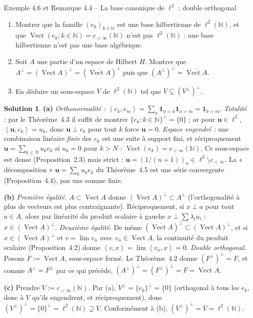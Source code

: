 \documentclass[11pt,a4paper]{article}
\newcommand{\N}{\mathbb{N}}
\newcommand{\adh}[1]{\overline{#1}}
\newcommand{\Vect}{\operatorname{Vect}}
\newcommand{\ps}[2]{\left\langle #1,#2\right\rangle}
\theoremstyle{definition}
\newtheorem*{solution}{Solution}
\begin{document}
\begin{exo}{Exemple 4.6 et Remarque 4.4 -- La base canonique de $\ell^2$ ; double orthogonal}
\begin{enumerate}[label=(\alph*)]
  \item Montrer que la famille $(e_k)_{k\in\N}$ est une base hilbertienne de $\ell^2(\N)$, et que $\Vect(e_k:k\in\N)=c_{<\infty}(\N)$ n'est pas $\ell^2(\N)$ : une base hilbertienne n'est pas une base algébrique.
  \item Soit $A$ une partie d'un espace de Hilbert $H$. Montrer que $A^\perp=(\Vect A)^\perp=(\adh{\Vect A})^\perp$ puis que $(A^\perp)^\perp=\adh{\Vect A}$.
  \item En déduire un sous-espace $V$ de $\ell^2(\N)$ tel que $V\subsetneq(V^\perp)^\perp$.
\end{enumerate}
\end{exo}

\begin{solution}
\noindent\textbf{(a)} \emph{Orthonormalité :} $\ps{e_k}{e_m}=\sum_n\mathbf 1_{n=k}\mathbf 1_{n=m}=\mathbf 1_{k=m}$. \emph{Totalité :} par le Théorème~4.3 il suffit de montrer $\{e_k:k\in\N\}^\perp=\{0\}$ ; or pour $\mathbf u\in\ell^2$, $\ps{\mathbf u}{e_k}=u_k$, donc $\mathbf u\perp e_k$ pour tout $k$ force $\mathbf u=0$. \emph{Espace engendré :} une combinaison linéaire \emph{finie} des $e_k$ est une suite à support fini, et réciproquement $\mathbf u=\sum_{k\le N}u_ke_k$ si $u_k=0$ pour $k>N$ : $\Vect(e_k)=c_{<\infty}(\N)$. Ce sous-espace est dense (Proposition~2.3) mais strict : $\mathbf u=(1/(n+1))_n\in\ell^2\setminus c_{<\infty}$. La « décomposition » $\mathbf u=\sum_k u_ke_k$ du Théorème~4.5 est une série convergente (Proposition~4.4), pas une somme finie.

\medskip
\noindent\textbf{(b)} \emph{Première égalité.} $A\subset\Vect A$ donne $(\Vect A)^\perp\subset A^\perp$ (l'orthogonalité à plus de vecteurs est plus contraignante). Réciproquement, si $x\perp a$ pour tout $a\in A$, alors par linéarité du produit scalaire à gauche $x\perp\sum\lambda_ia_i$ : $x\in(\Vect A)^\perp$. \emph{Deuxième égalité.} De même $(\adh{\Vect A})^\perp\subset(\Vect A)^\perp$, et si $x\in(\Vect A)^\perp$ et $v=\lim v_n$ avec $v_n\in\Vect A$, la continuité du produit scalaire (Proposition~4.2) donne $\ps vx=\lim\ps{v_n}x=0$. \emph{Double orthogonal.} Posons $F:=\adh{\Vect A}$, sous-espace fermé. Le Théorème~4.2 donne $(F^\perp)^\perp=F$, et comme $A^\perp=F^\perp$ par ce qui précède, $(A^\perp)^\perp=(F^\perp)^\perp=F=\adh{\Vect A}$.

\medskip
\noindent\textbf{(c)} Prendre $V:=c_{<\infty}(\N)$. Par (a), $V^\perp=\{e_k\}^\perp=\{0\}$ (orthogonal à tous les $e_k$, donc à $V$ qu'ils engendrent, et réciproquement), donc $(V^\perp)^\perp=\{0\}^\perp=\ell^2(\N)\supsetneq V$. Conformément à (b), $(V^\perp)^\perp=\adh V=\ell^2(\N)$.
\end{solution}
\end{document}
